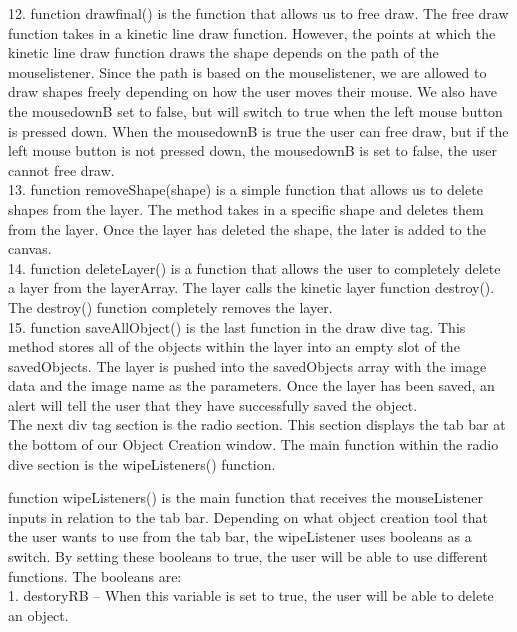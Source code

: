 \documentclass[a4paper, 11pt]{article} %
\begin{document}
12.	function drawfinal() is the function that allows us to free draw. The free draw function takes in a kinetic line draw function. However, the points at which the kinetic line draw function draws the shape depends on the path of the mouselistener. Since the path is based on the mouselistener, we are allowed to draw shapes freely depending on how the user moves their mouse. We also have the mousedownB set to false, but will switch to true when the left mouse button is pressed down. When the mousedownB is true the user can free draw, but if the left mouse button is not pressed down, the mousedownB is set to false, the user cannot free draw. \\

13.	function removeShape(shape) is a simple function that allows us to delete shapes from the layer. The method takes in a specific shape and deletes them from the layer. Once the layer has deleted the shape, the later is added to the canvas. \\

14.	function deleteLayer() is a function that allows the user to completely delete a layer from the layerArray. The layer calls the kinetic layer function destroy(). The destroy() function completely removes the layer. \\

15.	function saveAllObject() is the last function in the draw dive tag. This method stores all of the objects within the layer into an empty slot of the savedObjects. The layer is pushed into the savedObjects array with the image data and the image name as the parameters. Once the layer has been saved, an alert will tell the user that they have successfully saved the object.\\

The next div tag section is the radio section. This section displays the tab bar at the bottom of our Object Creation window. The main function within the radio dive section is the wipeListeners() function.

function wipeListeners() is the main function that receives the mouseListener inputs in relation to the tab bar. Depending on what object creation tool that the user wants to use from the tab bar, the wipeListener uses booleans as a switch. By setting these booleans to true, the user will be able to use different functions. The booleans are:\\

1.	destoryRB – When this variable is set to true, the user will be able to delete an object. \\
\end{document}
